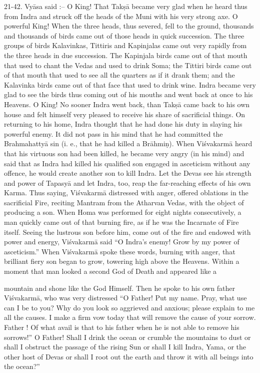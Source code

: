 21-42. Vy\=asa said :-- O King! That Tak\d{s}\=a became very glad when he heard thus from Indra and struck off the heads of the Muni with his very strong axe. O powerful King! When the three heads, thus severed, fell to the ground, thousands and thousands of birds came out of those heads in quick succession. The three groups of birds Kalavinkas, Tittiris and Kapinjalas came out very rapidly from the three heads in due succession. The Kapinjala birds came out of that mouth that used to chant the Vedas and used to drink Soma; the Tittiri birds came out of that mouth that used to see all the quarters as if it drank them; and the Kalavinka birds came out of that face that used to drink wine. Indra became very glad to see the birds thus coming out of his mouths and went back at once to his Heavens. O King! No sooner Indra went back, than Tak\d{s}\=a came back to his own house and felt himself very pleased to receive his share of sacrificial things. On returning to his home, Indra thought that he had done his duty in slaying his powerful enemy. It did not pass in his mind that he had committed the Brahmahatty\=a sin (i. e., that he had killed a Br\=ahmi\d{n}). When Vi\'svakarm\=a heard that his virtuous son had been killed, he became very angry (in his mind) and said that as Indra had killed his qualified son engaged in asceticism without any offence, he would create another son to kill Indra. Let the Devas see his strength and power of Tapasy\=a and let Indra, too, reap the far-reaching effects of his own Karma. Thus saying, Vi\'svakarm\=a distressed with anger, offered oblations in the sacrificial Fire, reciting Mantram from the Atharvan Vedas, with the object of producing a son. When Homa was performed for eight nights consecutively, a man quickly came out of that burning fire, as if he was the Incarnate of Fire itself. Seeing the lustrous son before him, come out of the fire and endowed with power and energy, Vi\'svakarm\=a said ``O Indra's enemy! Grow by my power of asceticism.'' When Vi\'svakarm\=a spoke these words, burning with anger, that brilliant fiery son began to grow, towering high above the Heavens. Within a moment that man looked a second God of Death and appeared like a

mountain and shone like the God Himself. Then he spoke to his own father Vi\'svakarm\=a, who was very distressed ``O Father! Put my name. Pray, what use can I be to you? Why do you look so aggrieved and anxious; please explain to me all the causes. I make a firm vow today that will remove the cause of your sorrow. Father ! Of what avail is that to his father when he is not able to remove his sorrows!'' O Father! Shall I drink the ocean or crumble the mountains to dust or shall I obstruct the passage of the rising Sun or shall I kill Indra, Yama, or the other host of Devas or shall I root out the earth and throw it with all beings into the ocean?''

